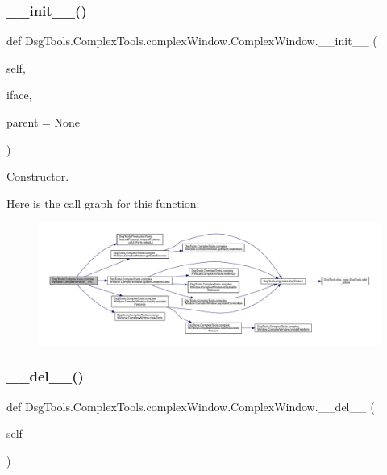\subsubsection{\texorpdfstring{\+\_\+\+\_\+init\+\_\+\+\_\+()}{\_\_init\_\_()}}
{\footnotesize\ttfamily def Dsg\+Tools.\+Complex\+Tools.\+complex\+Window.\+Complex\+Window.\+\_\+\+\_\+init\+\_\+\+\_\+ (\begin{DoxyParamCaption}\item[{}]{self,  }\item[{}]{iface,  }\item[{}]{parent = {\ttfamily None} }\end{DoxyParamCaption})}

\begin{DoxyVerb}Constructor.\end{DoxyVerb}
 Here is the call graph for this function\+:
\nopagebreak
\begin{figure}[H]
\begin{center}
\leavevmode
\includegraphics[width=350pt]{class_dsg_tools_1_1_complex_tools_1_1complex_window_1_1_complex_window_a12006c62a18ab276bb4f39c6525bfc26_cgraph}
\end{center}
\end{figure}
\mbox{\label{class_dsg_tools_1_1_complex_tools_1_1complex_window_1_1_complex_window_ab89113472e2ef4fc591f7c188aa752b9}} 
\subsubsection{\texorpdfstring{\+\_\+\+\_\+del\+\_\+\+\_\+()}{\_\_del\_\_()}}
{\footnotesize\ttfamily def Dsg\+Tools.\+Complex\+Tools.\+complex\+Window.\+Complex\+Window.\+\_\+\+\_\+del\+\_\+\+\_\+ (\begin{DoxyParamCaption}\item[{}]{self }\end{DoxyParamCaption})}

